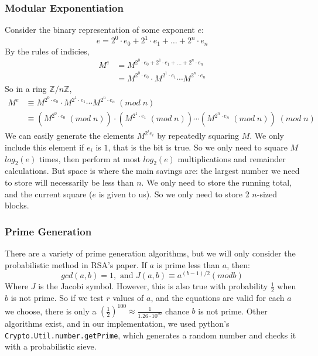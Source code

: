 \documentclass{article}
\begin{document}
\subsubsection{Modular Exponentiation}
Consider the binary representation of some exponent $e$:
\[ e = 2^0 \cdot e_0 + 2^1 \cdot e_1 + \ldots + 2^n \cdot e_n \]
By the rules of indicies,
\begin{align*}
    M^e & = M^{2^0 \cdot e_0 + 2^1 \cdot e_1 + \ldots + 2^n \cdot e_n}          \\
        & = M^{2^0 \cdot e_0} \cdot M^{ 2^1 \cdot e_1} \cdots M^{2^n \cdot e_n}
\end{align*}
So in a ring $\mathbb{Z} / n \mathbb{Z}$,
\begin{align*}
    M^e & \equiv M^{2^0 \cdot e_0} \cdot M^{ 2^1 \cdot e_1} \cdots M^{2^n \cdot e_n} \; (mod \; n)                                                  \\
        & \equiv ( M^{2^0 \cdot e_0} \; (mod \; n)) \cdot  (M^{ 2^1 \cdot e_1} \; (mod \; n)) \cdots (M^{2^n \cdot e_n} \; (mod \; n))\; (mod \; n)
\end{align*}
We can easily generate the elements $M^{2^i e_i}$ by repeatedly squaring $M$.
We only include this element if $e_i$ is $1$, that is the bit is true.
So we only need to square $M$ $log_2(e)$ times,
then perform at most $log_2(e)$ multiplications and remainder calculations.
But space is where the main savings are:
the largest number we need to store will necessarily be less than $n$.
We only need to store the running total, and the current square ($e$ is given to us).
So we only need to store 2 $n$-sized blocks.
\subsubsection{Prime Generation}
There are a variety of prime generation algorithms,
but we will only consider the probabilistic method in RSA's paper.
If $a$ is prime less than $a$, then:
\[
    gcd(a,b) = 1, \text{ and } J(a, b) \equiv a^{(b-1)/2} (mod b)
\]
Where $J$ is the Jacobi symbol.
However, this is also true with probability $\frac{1}{2}$ when $b$ is not prime.
So if we test $r$ values of $a$, and the equations are valid for each $a$ we choose,
there is only a $(\frac{1}{2})^{100} \approx \frac{1}{1.26 \cdot 10^{30}}$ chance $b$ is not prime.
Other algorithms exist, and in our implementation, we used python's \texttt{Crypto.Util.number.getPrime},
which generates a random number and checks it with a probabilistic sieve.
\newpage
\end{document}
